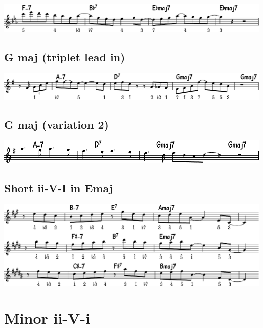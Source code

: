 \documentclass[11pt]{article}
\begin{document}
\begin{center}
\includegraphics[width=.98\linewidth]{e-flat.pdf}
\end{center}

\subsection{G maj (triplet lead in)}
\label{sec:orgf99a158}
\begin{center}
\includegraphics[width=.98\linewidth]{g_maj.pdf}
\end{center}

\subsection{G maj (variation 2)}
\label{sec:orgb22fd36}
\begin{center}
\includegraphics[width=.98\linewidth]{g_maj_v2.pdf}
\end{center}

\subsection{Short ii-V-I in Emaj}
\label{sec:orgc9e45fd}
\begin{center}
\includegraphics[width=.98\linewidth]{short-ii-v-in-Emaj.pdf}
\end{center}

\section{Minor ii-V-i}
\label{sec:orgdd0d736}
\end{document}
